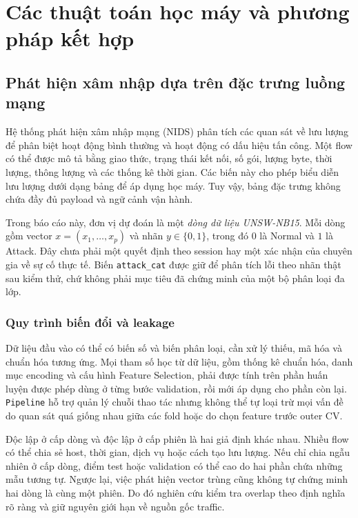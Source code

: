 \section{Các thuật toán học máy và phương pháp kết hợp}


\subsection{Phát hiện xâm nhập dựa trên đặc trưng luồng mạng}
Hệ thống phát hiện xâm nhập mạng (NIDS) phân tích các quan sát về lưu lượng để phân biệt hoạt động bình thường và hoạt động có dấu hiệu tấn công. Một flow có thể được mô tả bằng giao thức, trạng thái kết nối, số gói, lượng byte, thời lượng, thông lượng và các thống kê thời gian. Các biến này cho phép biểu diễn lưu lượng dưới dạng bảng để áp dụng học máy. Tuy vậy, bảng đặc trưng không chứa đầy đủ payload và ngữ cảnh vận hành.

Trong báo cáo này, đơn vị dự đoán là một \emph{dòng dữ liệu UNSW-NB15}. Mỗi dòng gồm vector $x=(x_1,\ldots,x_p)$ và nhãn $y\in\{0,1\}$, trong đó $0$ là Normal và $1$ là Attack. Đây chưa phải một quyết định theo session hay một xác nhận của chuyên gia về sự cố thực tế. Biến \texttt{attack\_cat} được giữ để phân tích lỗi theo nhãn thật sau kiểm thử, chứ không phải mục tiêu đã chứng minh của một bộ phân loại đa lớp.

\subsubsection{Quy trình biến đổi và leakage}
Dữ liệu đầu vào có thể có biến số và biến phân loại, cần xử lý thiếu, mã hóa và chuẩn hóa tương ứng. Mọi tham số học từ dữ liệu, gồm thống kê chuẩn hóa, danh mục encoding và cấu hình Feature Selection, phải được tính trên phần huấn luyện được phép dùng ở từng bước validation, rồi mới áp dụng cho phần còn lại. \texttt{Pipeline} hỗ trợ quản lý chuỗi thao tác nhưng không thể tự loại trừ mọi vấn đề do quan sát quá giống nhau giữa các fold hoặc do chọn feature trước outer CV.

Độc lập ở cấp dòng và độc lập ở cấp phiên là hai giả định khác nhau. Nhiều flow có thể chia sẻ host, thời gian, dịch vụ hoặc cách tạo lưu lượng. Nếu chỉ chia ngẫu nhiên ở cấp dòng, điểm test hoặc validation có thể cao do hai phần chứa những mẫu tương tự. Ngược lại, việc phát hiện vector trùng cũng không tự chứng minh hai dòng là cùng một phiên. Do đó nghiên cứu kiểm tra overlap theo định nghĩa rõ ràng và giữ nguyên giới hạn về nguồn gốc traffic.

